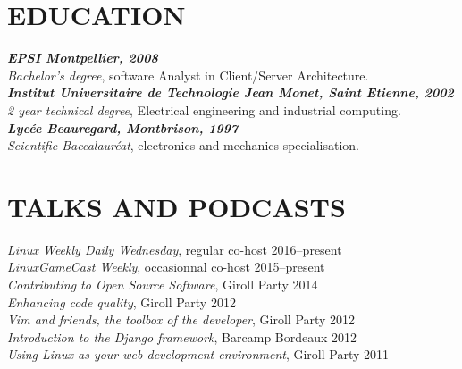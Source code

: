 \documentclass[margin]{res}
\begin{document}
\begin{resume}
\section{EDUCATION}
{\sl \textbf{EPSI Montpellier, 2008}\\
Bachelor's degree}, software Analyst in Client/Server Architecture.\\
{\sl \textbf{Institut Universitaire de Technologie Jean Monet, Saint Etienne, 2002}\\
2 year technical degree}, Electrical engineering and  industrial computing.\\
{\sl \textbf{Lyc\'{e}e Beauregard, Montbrison, 1997} \\
Scientific Baccalaur\'{e}at}, electronics and mechanics specialisation.

\section{TALKS AND PODCASTS}
    {\sl Linux Weekly Daily Wednesday}, regular co-host \hfill 2016--present \\
    {\sl LinuxGameCast Weekly}, occasionnal co-host \hfill 2015--present \\
    {\sl Contributing to Open Source Software}, Giroll Party \hfill 2014 \\
    {\sl Enhancing code quality}, Giroll Party \hfill 2012 \\
    {\sl Vim and friends, the toolbox of the developer}, Giroll Party \hfill 2012 \\
    {\sl Introduction to the Django framework}, Barcamp Bordeaux \hfill 2012 \\
    {\sl Using Linux as your web development environment}, Giroll Party \hfill 2011

\end{resume}
\end{document}

